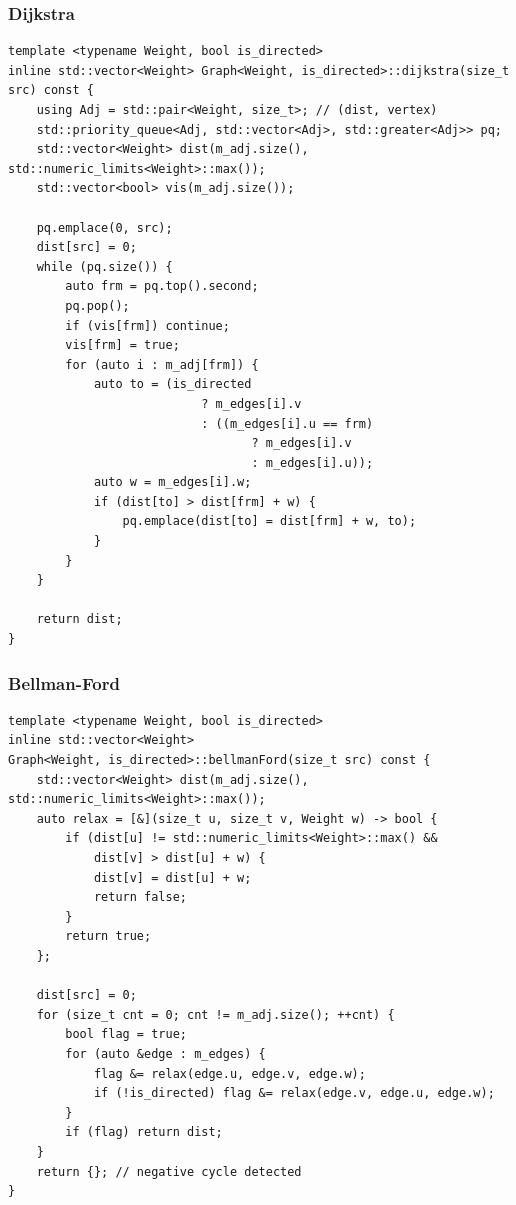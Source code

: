 \documentclass[UTF8]{article}
\begin{document}
\subsubsection{Dijkstra}
\begin{verbatim}
template <typename Weight, bool is_directed>
inline std::vector<Weight> Graph<Weight, is_directed>::dijkstra(size_t src) const {
	using Adj = std::pair<Weight, size_t>; // (dist, vertex)
	std::priority_queue<Adj, std::vector<Adj>, std::greater<Adj>> pq;
	std::vector<Weight> dist(m_adj.size(), std::numeric_limits<Weight>::max());
	std::vector<bool> vis(m_adj.size());

	pq.emplace(0, src);
	dist[src] = 0;
	while (pq.size()) {
		auto frm = pq.top().second;
		pq.pop();
		if (vis[frm]) continue;
		vis[frm] = true;
		for (auto i : m_adj[frm]) {
			auto to = (is_directed
						   ? m_edges[i].v
						   : ((m_edges[i].u == frm)
								  ? m_edges[i].v
								  : m_edges[i].u));
			auto w = m_edges[i].w;
			if (dist[to] > dist[frm] + w) {
				pq.emplace(dist[to] = dist[frm] + w, to);
			}
		}
	}

	return dist;
}
\end{verbatim}

\subsubsection{Bellman-Ford}
\begin{verbatim}
template <typename Weight, bool is_directed>
inline std::vector<Weight>
Graph<Weight, is_directed>::bellmanFord(size_t src) const {
	std::vector<Weight> dist(m_adj.size(), std::numeric_limits<Weight>::max());
	auto relax = [&](size_t u, size_t v, Weight w) -> bool {
		if (dist[u] != std::numeric_limits<Weight>::max() &&
			dist[v] > dist[u] + w) {
			dist[v] = dist[u] + w;
			return false;
		}
		return true;
	};

	dist[src] = 0;
	for (size_t cnt = 0; cnt != m_adj.size(); ++cnt) {
		bool flag = true;
		for (auto &edge : m_edges) {
			flag &= relax(edge.u, edge.v, edge.w);
			if (!is_directed) flag &= relax(edge.v, edge.u, edge.w);
		}
		if (flag) return dist;
	}
	return {}; // negative cycle detected
}
\end{verbatim}
\end{document}
